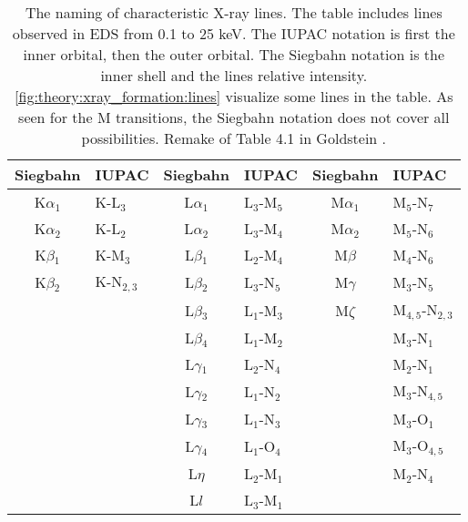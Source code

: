 \begin{table}[p]
    \centering
    \caption{
        The naming of characteristic X-ray lines.
        The table includes lines observed in EDS from 0.1 to 25 keV.
        The IUPAC notation is first the inner orbital, then the outer orbital.
        The Siegbahn notation is the inner shell and the lines relative intensity.
        \cref{fig:theory:xray_formation:lines} visualize some lines in the table.
        As seen for the M transitions, the Siegbahn notation does not cover all possibilities.
        Remake of Table 4.1 in Goldstein \cite{goldstein_scanning_2018}.
    }
    \label{tab:theory:naming_convention}
    \begin{tabular}{cl|cl|cl}
        \hline
        \textbf{Siegbahn} & \textbf{IUPAC} & \textbf{Siegbahn} & \textbf{IUPAC} & \textbf{Siegbahn} & \textbf{IUPAC}      \\
        \hline
        K$\alpha$$_1$     & K-L$_3$        & L$\alpha$$_1$     & L$_3$-M$_5$    & M$\alpha$$_1$     & M$_5$-N$_7$         \\
        K$\alpha$$_2$     & K-L$_2$        & L$\alpha$$_2$     & L$_3$-M$_4$    & M$\alpha$$_2$     & M$_5$-N$_6$         \\
        K$\beta$$_1$      & K-M$_3$        & L$\beta$$_1$      & L$_2$-M$_4$    & M$\beta$          & M$_4$-N$_6$         \\
        K$\beta$$_2$      & K-N$_{2,3}$    & L$\beta$$_2$      & L$_3$-N$_5$    & M$\gamma$         & M$_3$-N$_5$         \\
                          &                & L$\beta$$_3$      & L$_1$-M$_3$    & M$\zeta$          & M$_{4,5}$-N$_{2,3}$ \\
                          &                & L$\beta$$_4$      & L$_1$-M$_2$    &                   & M$_3$-N$_1$         \\
                          &                & L$\gamma$$_1$     & L$_2$-N$_4$    &                   & M$_2$-N$_1$         \\
                          &                & L$\gamma$$_2$     & L$_1$-N$_2$    &                   & M$_3$-N$_{4,5}$     \\
                          &                & L$\gamma$$_3$     & L$_1$-N$_3$    &                   & M$_3$-O$_1$         \\
                          &                & L$\gamma$$_4$     & L$_1$-O$_4$    &                   & M$_3$-O$_{4,5}$     \\
                          &                & L$\eta$           & L$_2$-M$_1$    &                   & M$_2$-N$_4$         \\
                          &                & L$l$              & L$_3$-M$_1$    &                   &                     \\
        \hline
    \end{tabular}
\end{table}